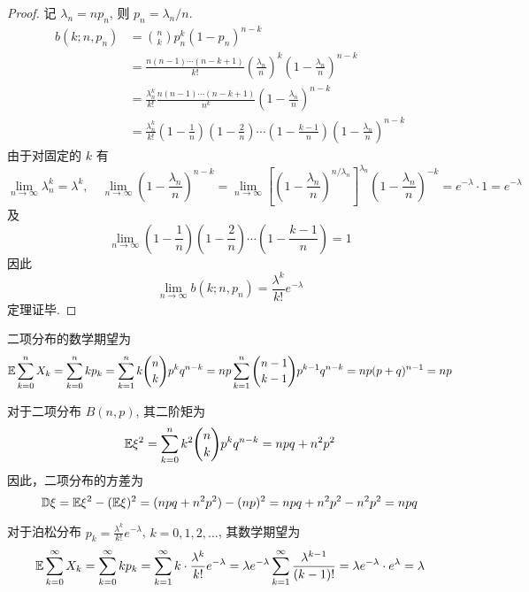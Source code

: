 \begin{proof}
记 $\lambda_n = np_n$, 则 $p_n = \lambda_n/n$.
\begin{align*}
b(k;n,p_n) &= \binom{n}{k} p_n^k (1-p_n)^{n-k} \\
&= \frac{n(n-1)\cdots(n-k+1)}{k!} \left(\frac{\lambda_n}{n}\right)^k \left(1-\frac{\lambda_n}{n}\right)^{n-k} \\
&= \frac{\lambda_n^k}{k!} \frac{n(n-1)\cdots(n-k+1)}{n^k} \left(1-\frac{\lambda_n}{n}\right)^{n-k} \\
&= \frac{\lambda_n^k}{k!} \left(1-\frac{1}{n}\right) \left(1-\frac{2}{n}\right) \cdots \left(1-\frac{k-1}{n}\right) \left(1-\frac{\lambda_n}{n}\right)^{n-k}
\end{align*}
由于对固定的 $k$ 有
\[
\lim_{n\to\infty} \lambda_n^k = \lambda^k, \quad \lim_{n\to\infty} \left(1-\frac{\lambda_n}{n}\right)^{n-k} = \lim_{n\to\infty} \left[\left(1-\frac{\lambda_n}{n}\right)^{n/\lambda_n}\right]^{\lambda_n} \left(1-\frac{\lambda_n}{n}\right)^{-k} = e^{-\lambda} \cdot 1 = e^{-\lambda}
\]
及
\[
\lim_{n\to\infty} \left(1-\frac{1}{n}\right) \left(1-\frac{2}{n}\right) \cdots \left(1-\frac{k-1}{n}\right) = 1
\]
因此
\[
\lim_{n\to\infty} b(k;n,p_n) = \frac{\lambda^k}{k!}e^{-\lambda}
\]
定理证毕.
\end{proof}
\begin{proposition} \label{prop:binomial_expectation}
二项分布的数学期望为
\[
\mathbb{E}\sum_{k=0}^n X_k = \sum_{k=0}^n k p_k = \sum_{k=1}^n k\binom{n}{k} p^k q^{n-k} = np \sum_{k=1}^n \binom{n-1}{k-1} p^{k-1} q^{n-k} = np(p+q)^{n-1} = np
\]
\end{proposition}
\begin{proposition} \label{prop:binomial_variance}
对于二项分布 $B(n,p)$, 其二阶矩为
\[
\mathbb{E}\xi^2 = \sum_{k=0}^n k^2 \binom{n}{k} p^k q^{n-k} = npq + n^2p^2
\]
因此，二项分布的方差为
\begin{equation} \label{eq:binomial_variance_formula}
\mathbb{D}\xi = \mathbb{E}\xi^2 - (\mathbb{E}\xi)^2 = (npq + n^2p^2) - (np)^2 = npq + n^2p^2 - n^2p^2 = npq
\end{equation}
\end{proposition}
\begin{proposition} \label{prop:poisson_expectation}
对于泊松分布 $p_k = \frac{\lambda^k}{k!}e^{-\lambda}$, $k=0,1,2,\ldots$, 其数学期望为
\[
\mathbb{E}\sum_{k=0}^\infty X_k = \sum_{k=0}^\infty k p_k = \sum_{k=1}^\infty k \cdot \frac{\lambda^k}{k!}e^{-\lambda} = \lambda e^{-\lambda} \sum_{k=1}^\infty \frac{\lambda^{k-1}}{(k-1)!} = \lambda e^{-\lambda} \cdot e^\lambda = \lambda
\]
\end{proposition}
